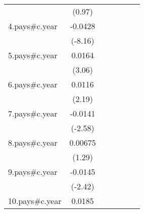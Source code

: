 {\begin{tabular}{l*{6}{c}}
                    &      (0.97)         &                     &                     &                     &                     &                     \\
[1em]
4.pays#c.year       &     -0.0428\sym{***}&                     &                     &                     &                     &                     \\
                    &     (-8.16)         &                     &                     &                     &                     &                     \\
[1em]
5.pays#c.year       &      0.0164\sym{**} &                     &                     &                     &                     &                     \\
                    &      (3.06)         &                     &                     &                     &                     &                     \\
[1em]
6.pays#c.year       &      0.0116\sym{*}  &                     &                     &                     &                     &                     \\
                    &      (2.19)         &                     &                     &                     &                     &                     \\
[1em]
7.pays#c.year       &     -0.0141\sym{*}  &                     &                     &                     &                     &                     \\
                    &     (-2.58)         &                     &                     &                     &                     &                     \\
[1em]
8.pays#c.year       &     0.00675         &                     &                     &                     &                     &                     \\
                    &      (1.29)         &                     &                     &                     &                     &                     \\
[1em]
9.pays#c.year       &     -0.0145\sym{*}  &                     &                     &                     &                     &                     \\
                    &     (-2.42)         &                     &                     &                     &                     &                     \\
[1em]
10.pays#c.year      &      0.0185\sym{***}&                     &                     &                     &                     &                     \\

\end{tabular}}
